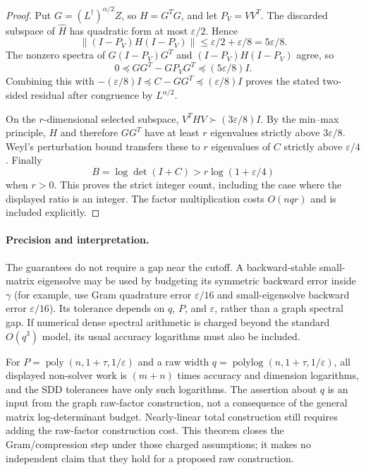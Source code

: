 \documentclass[11pt]{article}
\begin{document}
\begin{proof}
Put $G=(L^\dagger)^{\alpha/2}Z$, so $H=G^TG$, and let $P_V=VV^T$.
The discarded subspace of $\widehat H$ has quadratic form at most
$\varepsilon/2$.  Hence
\[
 \|(I-P_V)H(I-P_V)\|
       \le\varepsilon/2+\varepsilon/8=5\varepsilon/8.
\]
The nonzero spectra of $G(I-P_V)G^T$ and
$(I-P_V)H(I-P_V)$ agree, so
\[
 0\preceq GG^T-GP_VG^T\preceq(5\varepsilon/8)I.
\]
Combining this with $-(\varepsilon/8)I\preceq C-GG^T
\preceq(\varepsilon/8)I$ proves the stated two-sided residual after
congruence by $L^{\alpha/2}$.

On the $r$-dimensional selected subspace,
$V^THV\succ(3\varepsilon/8)I$.
By the min--max principle, $H$ and therefore $GG^T$ have at least
$r$ eigenvalues strictly above $3\varepsilon/8$.
Weyl's perturbation bound transfers these to $r$ eigenvalues of $C$
strictly above $\varepsilon/4$.  Finally
\[
 B=\log\det(I+C)>r\log(1+\varepsilon/4)
\]
when $r>0$.  This proves the strict integer count, including the
case where the displayed ratio is an integer.
The factor multiplication costs $O(nqr)$ and is included explicitly.
\end{proof}

\paragraph{Precision and interpretation.}
The guarantees do not require a gap near the cutoff.  A backward-stable
small-matrix eigensolve may be used by budgeting its symmetric backward
error inside $\gamma$ (for example, use Gram quadrature error
$\varepsilon/16$ and small-eigensolve backward error
$\varepsilon/16$).  Its tolerance depends on $q$, $P$, and
$\varepsilon$, rather than a graph spectral gap.  If numerical dense
spectral arithmetic is charged beyond the standard $O(q^3)$ model,
its usual accuracy logarithms must also be included.

For $P=\operatorname{poly}(n,1+\tau,1/\varepsilon)$ and a raw width
$q=\operatorname{polylog}(n,1+\tau,1/\varepsilon)$, all displayed
non-solver work is $(m+n)$ times accuracy and dimension logarithms,
and the SDD tolerances have only such logarithms.  The assertion about
$q$ is an input from the graph raw-factor construction, not a consequence
of the general matrix log-determinant budget.  Nearly-linear total
construction still requires adding the raw-factor construction cost.
This theorem closes the Gram/compression step under those charged
assumptions; it makes no independent claim that they hold for a proposed
raw construction.
\end{document}
